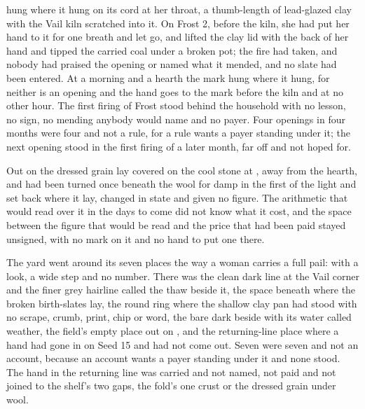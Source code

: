  hung where it hung on its cord at her throat, a thumb-length of lead-glazed clay with the Vail kiln scratched into it. On Frost 2, before the kiln, she had put her hand to it for one breath and let go, and lifted the clay lid with the back of her hand and tipped the carried coal under a broken pot; the fire had taken, and nobody had praised the opening or named what it mended, and no slate had been entered. At a morning and a hearth the mark hung where it hung, for neither is an opening and the hand goes to the mark before the kiln and at no other hour. The first firing of Frost stood behind the household with no lesson, no sign, no mending anybody would name and no payer. Four openings in four months were four and not a rule, for a rule wants a payer standing under it; the next opening stood in the first firing of a later month, far off and not hoped for.

Out on  the dressed grain lay covered on the cool stone at , away from the hearth, and had been turned once beneath the wool for damp in the first of the light and set back where it lay, changed in state and given no figure. The arithmetic that would read over it in the days to come did not know what it cost, and the space between the figure that would be read and the price that had been paid stayed unsigned, with no mark on it and no hand to put one there.

The yard went around its seven places the way a woman carries a full pail: with a look, a wide step and no number. There was the clean dark line at the Vail corner and the finer grey hairline called the thaw beside it, the space beneath  where the broken birth-slates lay, the round ring where the shallow clay pan had stood with no scrape, crumb, print, chip or word, the bare dark  beside  with its water called weather, the field's empty place out on , and the returning-line place where a hand had gone in on Seed 15 and had not come out. Seven were seven and not an account, because an account wants a payer standing under it and none stood. The hand in the returning line was carried and not named, not paid and not joined to the shelf's two gaps, the fold's one crust or the dressed grain under wool.


